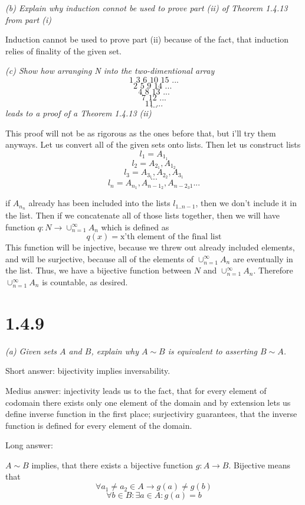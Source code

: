 \documentclass[11pt,oneside,titlepage]{article}
\begin{document}
\textit{(b) Explain why induction connot be used to prove part (ii) of
  Theorem 1.4.13 from part (i)}

Induction cannot be used to prove part (ii) because of the fact, that induction
relies of finality of the given set.

\textit{(c) Show how arranging N into the two-dimentional array }
$$\text{1 3 6 10 15 ...}$$
$$\text{2 5 9 14 ...   }$$
$$\text{4 8 13 ...}$$
$$\text{7 12 ...}$$
$$\text{11 ...}$$
$$...$$
\textit{leads to a proof of a Theorem 1.4.13 (ii)}

This proof will not be as rigorous as the ones before that, but i'll try them
anyways. Let us convert all of the given sets onto lists. Then let us construct
lists
$$l_1 = {A_{1_1}}$$
$$l_2 = {A_{2_1}, A_{1_2}}$$
$$l_3 = {A_{3_1}, A_{2_2}, A_{3_1}}$$
$$...$$
$$l_n = {A_{n_1}, A_{n - 1_{2}}, A_{n - 2_{3}1} ...}$$

if $A_{n_n}$ already has been included into the lists $l_{1..n - 1}$, then we don't
include it in the list.
Then if we concatenate all of those lists together, then we will have function
$q: N \to \cup^{\infty}_{n = 1} A_n$ which is defined as
$$q(x) = \text{x'th element of the final list}$$
This function will be injective, because we threw out already included elements, and
will be surjective, because all of the elements of $\cup^{\infty}_{n = 1} A_n$ are
eventually in the list. Thus, we have a bijective function between $N$ and
$\cup^{\infty}_{n = 1} A_n$. Therefore $\cup^{\infty}_{n = 1} A_n$ is countable, as
desired.

\section*{1.4.9}
\textit{(a) Given sets $A$ and $B$, explain why $A \sim B$ is equivalent to asserting
  $B \sim A$.}

Short answer: bijectivity implies inversability.

Medius answer: injectivity leads us to the fact, that for every element of codomain there
exists only one element of the domain and by extension lets us
define inverse function in the first place;
surjectiviry guarantees, that the inverse function is defined for every element of the domain.

Long answer:

$A \sim B$ implies, that there exists a bijective function $g: A \to B$. Bijective means
that
$$\forall a_1 \neq a_2 \in A \to g(a) \neq g(b)$$
$$\forall b \in B: \exists a \in A: g(a) = b$$
\end{document}
